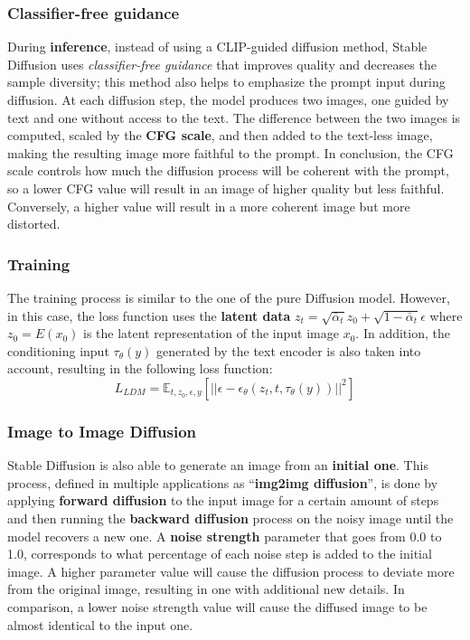 \documentclass[preprint]{elsarticle}
\begin{document}
\subsubsection{Classifier-free guidance}
During \textbf{inference}, instead of using a CLIP-guided diffusion method, Stable Diffusion uses 
\emph{classifier-free guidance} \cite{ho2022classifierfree}
that improves quality and decreases the sample diversity; 
this method also helps to emphasize the prompt input during diffusion. 
At each diffusion step, the model produces two images, one guided by text and one without access to the text. 
The difference between the two images is computed, scaled by the \textbf{CFG scale}, and then added to the text-less image, 
making the resulting image more faithful to the prompt. 
In conclusion, the CFG scale controls how much the diffusion process will be coherent with the prompt, 
so a lower CFG value will result in an image of higher quality but less faithful. Conversely, 
a higher value will result in a more coherent image but more distorted.

\subsubsection{Training}
The training process is similar to the one of the pure Diffusion model.
However, in this case, the loss function
uses the \textbf{latent data} $z_t=\sqrt{\bar{\alpha}_t}z_0 + \sqrt{1-\bar{\alpha}_t}\epsilon$ where
$z_0 = E(x_0)$ is the latent representation of the input image $x_0$.
In addition, the conditioning input $\tau_\theta(y)$ generated by the text encoder is also taken into account,
resulting in the following loss function:
\begin{equation}
	L_{LDM} = \mathbb{E}_{t,z_0,\epsilon,y}\left[||\epsilon-\epsilon_\theta(z_t,t,\tau_\theta(y))||^2\right]
\end{equation}

\subsubsection{Image to Image Diffusion}
Stable Diffusion is also able to generate an image from an \textbf{initial one}. This process, defined in multiple applications 
as ``\textbf{img2img diffusion}'', is done by applying \textbf{forward diffusion} to the input image for a certain amount of steps and then 
running the \textbf{backward diffusion} process on the noisy image until the model recovers a new one. A \textbf{noise strength} parameter 
that goes from 0.0 to 1.0, corresponds to what percentage of each noise step is added to the initial image. 
A higher parameter value will cause the diffusion process to deviate more from the original image, resulting in one with 
additional new details. 
In comparison, a lower noise strength value will cause the diffused image to be almost identical to the input one.
\end{document}
